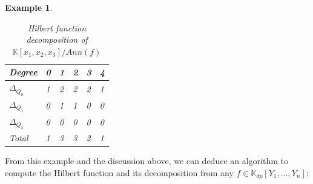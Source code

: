 \documentclass[a4paper,11p]{amsart}
\newtheorem{example0}[defn0]{Example}
\newenvironment{example}{ \begin{example0}\rm}{\end{example0}}
\newcommand{\K}{\mathbb K}
\begin{document}
\begin{example}
\begin{table}[h!] 
\centering
\caption{Hilbert function decomposition of $\K[x_1,x_2,x_3]/Ann(f)$} \label{example:table:HFdecomp}
\begin{tabular}{|l|l|l|l|l|l|}
\hline
Degree         & 0 & 1 & 2 & 3 & 4 \\ \hline
$\Delta_{Q_0}$ & 1 & 2 & 2 & 2 & 1 \\ \hline
$\Delta_{Q_1}$ & 0 & 1 & 1 & 0 & 0 \\ \hline
$\Delta_{Q_2}$ & 0 & 0 & 0 & 0 & 0 \\ \hline
Total          & 1 & 3 & 3 & 2 & 1 \\ \hline
\end{tabular}
\end{table}
\end{example}

From this example and the discussion above, we can deduce an algorithm to compute the Hilbert function and its decomposition from any $f\in \K_{dp}[Y_1,\ldots, Y_n]$:
\end{document}
